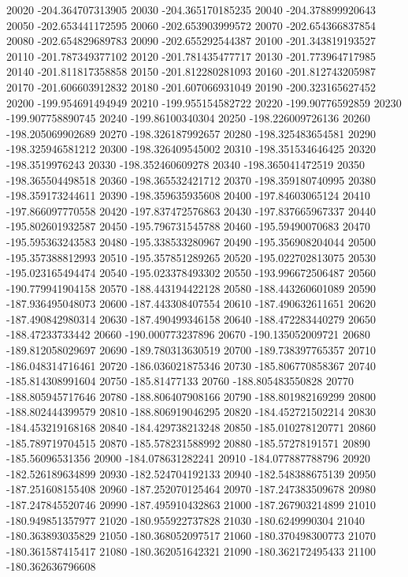 {20020 -204.364707313905
20030 -204.365170185235
20040 -204.378899920643
20050 -202.653441172595
20060 -202.653903999572
20070 -202.654366837854
20080 -202.654829689783
20090 -202.655292544387
20100 -201.343819193527
20110 -201.787349377102
20120 -201.781435477717
20130 -201.773964717985
20140 -201.811817358858
20150 -201.812280281093
20160 -201.812743205987
20170 -201.606603912832
20180 -201.607066931049
20190 -200.323165627452
20200 -199.954691494949
20210 -199.955154582722
20220 -199.90776592859
20230 -199.907758890745
20240 -199.86100340304
20250 -198.226009726136
20260 -198.205069902689
20270 -198.326187992657
20280 -198.325483654581
20290 -198.325946581212
20300 -198.326409545002
20310 -198.351534646425
20320 -198.3519976243
20330 -198.352460609278
20340 -198.365041472519
20350 -198.365504498518
20360 -198.365532421712
20370 -198.359180740995
20380 -198.359173244611
20390 -198.359635935608
20400 -197.84603065124
20410 -197.866097770558
20420 -197.837472576863
20430 -197.837665967337
20440 -195.802601932587
20450 -195.796731545788
20460 -195.59490070683
20470 -195.595363243583
20480 -195.338533280967
20490 -195.356908204044
20500 -195.357388812993
20510 -195.357851289265
20520 -195.022702813075
20530 -195.023165494474
20540 -195.023378493302
20550 -193.996672506487
20560 -190.779941904158
20570 -188.443194422128
20580 -188.443260601089
20590 -187.936495048073
20600 -187.443308407554
20610 -187.490632611651
20620 -187.490842980314
20630 -187.490499346158
20640 -188.472283440279
20650 -188.47233733442
20660 -190.000773237896
20670 -190.135052009721
20680 -189.812058029697
20690 -189.780313630519
20700 -189.738397765357
20710 -186.048314716461
20720 -186.036021875346
20730 -185.806770858367
20740 -185.814308991604
20750 -185.81477133
20760 -188.805483550828
20770 -188.805945717646
20780 -188.806407908166
20790 -188.801982169299
20800 -188.802444399579
20810 -188.806919046295
20820 -184.452721502214
20830 -184.453219168168
20840 -184.429738213248
20850 -185.010278120771
20860 -185.789719704515
20870 -185.578231588992
20880 -185.57278191571
20890 -185.56096531356
20900 -184.078631282241
20910 -184.077887788796
20920 -182.526189634899
20930 -182.524704192133
20940 -182.548388675139
20950 -187.251608155408
20960 -187.252070125464
20970 -187.247383509678
20980 -187.247845520746
20990 -187.495910432863
21000 -187.267903214899
21010 -180.949851357977
21020 -180.955922737828
21030 -180.6249990304
21040 -180.363893035829
21050 -180.368052097517
21060 -180.370498300773
21070 -180.361587415417
21080 -180.362051642321
21090 -180.362172495433
21100 -180.362636796608
}
